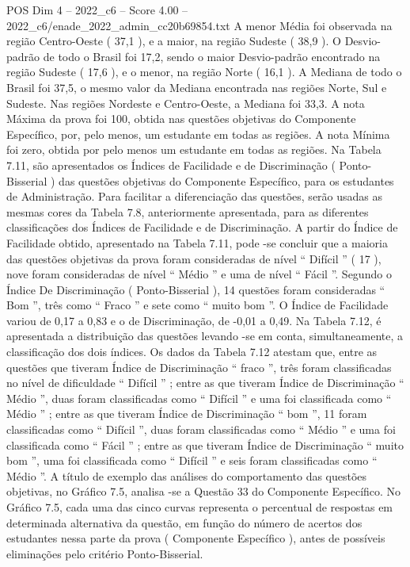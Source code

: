 \begin{textsample}{POS Dim 4 – 2022\_c6 – Score 4.00 – 2022\_c6/enade\_2022\_admin\_cc20b69854.txt}
A menor Média foi observada na região Centro-Oeste ( 37,1 ), e a maior, na região Sudeste ( 38,9 ).
O Desvio-padrão de todo o Brasil foi 17,2, sendo o maior Desvio-padrão encontrado na região Sudeste ( 17,6 ), e o menor, na região Norte ( 16,1 ).
A Mediana de todo o Brasil foi 37,5, o mesmo valor da Mediana encontrada nas regiões Norte, Sul e Sudeste.
Nas regiões Nordeste e Centro-Oeste, a Mediana foi 33,3.
A nota Máxima da prova foi 100, obtida nas questões objetivas do Componente Específico, por, pelo menos, um estudante em todas as regiões.
A nota Mínima foi zero, obtida por pelo menos um estudante em todas as regiões.
Na Tabela 7.11, são apresentados os Índices de Facilidade e de Discriminação ( Ponto-Bisserial ) das questões objetivas do Componente Específico, para os estudantes de Administração.
Para facilitar a diferenciação das questões, serão usadas as mesmas cores da Tabela 7.8, anteriormente apresentada, para as diferentes classificações dos Índices de Facilidade e de Discriminação.
A partir do Índice de Facilidade obtido, apresentado na Tabela 7.11, pode -se concluir que a maioria das questões objetivas da prova foram consideradas de nível “ Difícil ” ( 17 ), nove foram consideradas de nível “ Médio ” e uma de nível “ Fácil ”.
Segundo o Índice De Discriminação ( Ponto-Bisserial ), 14 questões foram consideradas “ Bom ”, três como “ Fraco ” e sete como “ muito bom ”.
O Índice de Facilidade variou de 0,17 a 0,83 e o de Discriminação, de -0,01 a 0,49.
Na Tabela 7.12, é apresentada a distribuição das questões levando -se em conta, simultaneamente, a classificação dos dois índices.
Os dados da Tabela 7.12 atestam que, entre as questões que tiveram Índice de Discriminação “ fraco ”, três foram classificadas no nível de dificuldade “ Difícil ” ; entre as que tiveram Índice de Discriminação “ Médio ”, duas foram classificadas como “ Difícil ” e uma foi classificada como “ Médio ” ; entre as que tiveram Índice de Discriminação “ bom ”, 11 foram classificadas como “ Difícil ”, duas foram classificadas como “ Médio ” e uma foi classificada como “ Fácil ” ; entre as que tiveram Índice de Discriminação “ muito bom ”, uma foi classificada como “ Difícil ” e seis foram classificadas como “ Médio ”.
A título de exemplo das análises do comportamento das questões objetivas, no Gráfico 7.5, analisa -se a Questão 33 do Componente Específico.
No Gráfico 7.5, cada uma das cinco curvas representa o percentual de respostas em determinada alternativa da questão, em função do número de acertos dos estudantes nessa parte da prova ( Componente Específico ), antes de possíveis eliminações pelo critério Ponto-Bisserial.

\end{textsample}
